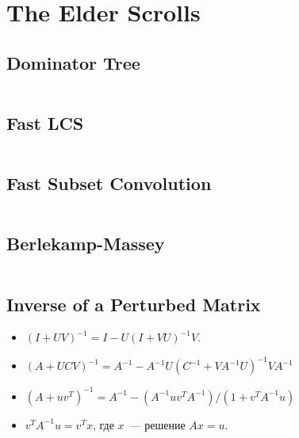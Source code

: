 \section{The Elder Scrolls}

\subsection{Dominator Tree}

\inputminted{cpp}{\code/dominator_tree.cpp}

\subsection{Fast LCS}

\inputminted{cpp}{\code/fast_lcs_short.cpp}

\subsection{Fast Subset Convolution}

\inputminted{cpp}{\code/fast_subset_convolution.cpp}

\subsection{Berlekamp-Massey}

\inputminted{cpp}{\code/berlekamp.cpp}

\subsection{Inverse of a Perturbed Matrix}

\begin{itemize} 
	\item $(I + UV)^{-1} = I - U(I + VU)^{-1} V$.
	\item $(A + UCV)^{-1} = A^{-1} - A^{-1} U (C^{-1} + VA^{-1} U)^{-1} VA^{-1}$
	\item $(A + uv^T)^{-1} = A^{-1} - (A^{-1} uv^T A^{-1})/(1 + v^T A^{-1} u)$
	\item $v^T A^{-1} u = v^T x$, где $x$~--- решение $Ax = u$.
\end{itemize}
